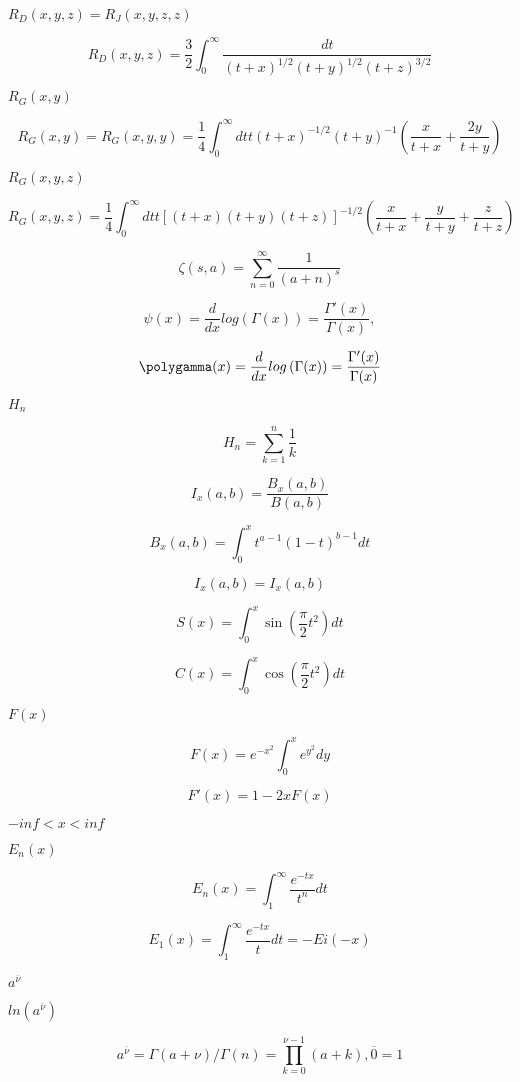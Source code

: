 \documentclass{article}
\begin{document}
$ R_D(x,y,z) = R_J(x,y,z,z) $
\pagebreak

\[ R_D(x,y,z) = \frac{3}{2} \int_0^\infty \frac{dt}{(t + x)^{1/2}(t + y)^{1/2}(t + z)^{3/2}} \]
\pagebreak

$ R_G(x,y) $
\pagebreak

\[ R_G(x,y) = R_G(x,y,y) = \frac{1}{4} \int_0^\infty dt t (t + x)^{-1/2}(t + y)^{-1} (\frac{x}{t + x} + \frac{2y}{t + y}) \]
\pagebreak

$ R_G(x,y,z) $
\pagebreak

\[ R_G(x,y,z) = \frac{1}{4} \int_0^\infty dt t [(t + x)(t + y)(t + z)]^{-1/2} (\frac{x}{t + x} + \frac{y}{t + y} + \frac{z}{t + z}) \]
\pagebreak

\[ \zeta(s, a) = \sum_{n=0}^{\infty}\frac{1}{(a + n)^s} \]
\pagebreak

\[ \psi(x) = \frac{d}{dx}log\left(\Gamma(x)\right) = \frac{\Gamma'(x)}{\Gamma(x)}, \]
\pagebreak

\[ \polygamma(x) = \frac{d}{dx}log\left(\Gamma(x)\right) = \frac{\Gamma'(x)}{\Gamma(x)} \]
\pagebreak

$ H_n $
\pagebreak

\[ H_n = \sum_{k=1}^{n}\frac{1}{k} \]
\pagebreak

\[ I_x(a, b) = \frac{B_x(a,b)}{B(a,b)} \]
\pagebreak

\[ B_x(a,b) = \int_0^x t^{a - 1} (1 - t)^{b - 1} dt \]
\pagebreak

\[ I_x(a, b) = I_x(a, b) \]
\pagebreak

\[ S(x) = \int_0^x \sin(\frac{\pi}{2}t^2) dt \]
\pagebreak

\[ C(x) = \int_0^x \cos(\frac{\pi}{2}t^2) dt \]
\pagebreak

$ F(x) $
\pagebreak

\[ F(x) = e^{-x^2}\int_0^x e^{y^2}dy \]
\pagebreak

\[ F'(x) = 1 - 2xF(x) \]
\pagebreak

$ -inf < x < inf $
\pagebreak

$ E_n(x) $
\pagebreak

\[ E_n(x) = \int_1^\infty \frac{e^{-tx}}{t^n}dt \]
\pagebreak

\[ E_1(x) = \int_1^\infty \frac{e^{-tx}}{t}dt = -Ei(-x) \]
\pagebreak

$ a^{\overline{\nu}} $
\pagebreak

$ ln(a^{\overline{\nu}}) $
\pagebreak

\[ a^{\overline{\nu}} = \Gamma(a + \nu) / \Gamma(n) = \prod_{k=0}^{\nu-1} (a + k), \overline{0} = 1 \]
\pagebreak
\end{document}
